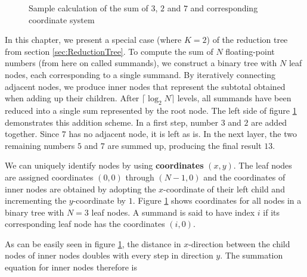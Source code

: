 \newcommand{\numLevels}{\lceil \log_2 N \rceil}
\newcommand{\ffs}{\textrm{ffs}}
\newcommand{\nodesum}{\textrm{sum}\,}

\begin{figure}[H]
\centering
{}
\caption{Sample calculation of the sum of $3$, $2$ and $7$ and corresponding coordinate system}
\label{fig:coordinateExample}
\end{figure}

In this chapter, we present a special case (where $K = 2$) of the reduction tree from section \ref{sec:ReductionTree}.
To compute the sum of $N$ floating-point numbers (from here on called summands), we construct a binary tree with $N$ leaf nodes,
each corresponding to a single summand.
By iteratively connecting adjacent nodes, we produce inner nodes that represent the subtotal obtained when adding up their children.
After $\numLevels$ levels, all summands have been reduced into a single sum represented by the root node.
The left side of figure \ref{fig:coordinateExample} demonstrates this addition scheme. In a first step, number $3$ and $2$ are added together.
Since $7$ has no adjacent node, it is left as is. In the next layer, the two remaining numbers $5$ and $7$ are summed up, producing the final
result $13$.

We can uniquely identify nodes by using \textbf{coordinates} $(x, y)$. The leaf nodes are assigned coordinates
$(0,0)$ through $(N-1,0)$ and the coordinates of inner nodes are obtained by adopting the $x$-coordinate of their left child and incrementing
the $y$-coordinate by $1$. Figure \ref{fig:coordinateExample} shows coordinates for all nodes in a binary tree with $N = 3$ leaf nodes.
A summand is said to have index $i$ if its corresponding leaf node has the coordinates $(i,0)$.

As can be easily seen in figure \ref{fig:coordinateExample}, the distance in $x$-direction between the child nodes of inner nodes doubles
with every step in direction $y$. The summation equation for inner nodes therefore is

